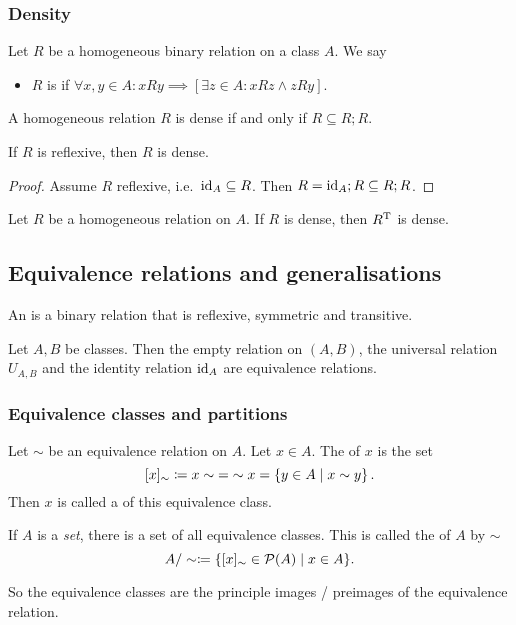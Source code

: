 \subsubsection{Density}
\begin{definition}
Let $R$ be a homogeneous binary relation on a class $A$. We say
\begin{itemize}
\item $R$ is  if $\forall x,y\in A: xRy \implies [\exists z\in A: xRz \land zRy]$.
\end{itemize}
\end{definition}

\begin{lemma}
A homogeneous relation $R$ is dense \textup{if and only if} $R \subseteq R;R$.
\end{lemma}
\begin{lemma}
If $R$ is reflexive, then $R$ is dense.
\end{lemma}
\begin{proof}
Assume $R$ reflexive, i.e.\ $\operatorname{id}_A\subseteq R$. Then $R = \operatorname{id}_A ;R \subseteq R;R$.
\end{proof}

\begin{lemma}
Let $R$ be a homogeneous relation on $A$. If $R$ is dense, then $R^{\mathrm{T}}$ is dense.
\end{lemma}

\subsection{Equivalence relations and generalisations}
\begin{definition}
An  is a binary relation that is reflexive, symmetric and transitive.
\end{definition}

\begin{lemma}
Let $A,B$ be classes. Then the empty relation on $(A,B)$, the universal relation $U_{A,B}$ and the identity relation $\operatorname{id}_A$ are equivalence relations.
\end{lemma}

\subsubsection{Equivalence classes and partitions}
\begin{definition}
Let $\sim$ be an equivalence relation on $A$. Let $x\in A$. The  of $x$ is the set
\[ [x]_\sim \coloneqq x\sim \; = \; \sim x = \left\{ y\in A \;\middle|\; x\sim y \right\}. \]
Then $x$ is called a  of this equivalence class.

If $A$ is a \emph{set}, there is a set of all equivalence classes. This is called the  of $A$ by $\sim$
\[ A/\sim \coloneqq \{ [x]_\sim \in \operatorname{\mathcal{P}}(A) \;|\; x\in A \}. \]
\end{definition}
So the equivalence classes are the principle images / preimages of the equivalence relation.

